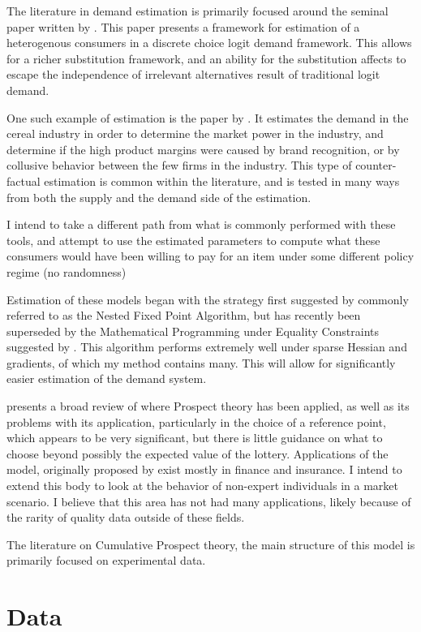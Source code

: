 \documentclass[12pt]{paper}
\begin{document}
The literature in demand estimation is primarily focused around the
seminal paper written by \cite*{BLP}. This paper presents a framework
for estimation of a heterogenous consumers in a discrete choice logit
demand framework. This allows for a richer substitution framework, and
an ability for the substitution affects to escape the independence of
irrelevant alternatives result of traditional logit demand.

One such example of estimation is the paper by \cite*{Cereal}. It
estimates the demand in the cereal industry in order to determine the
market power in the industry, and determine if the high product
margins were caused by brand recognition, or by collusive behavior
between the few firms in the industry. This type of counter-factual
estimation is common within the literature, and is tested in many ways
from both the supply and the demand side of the estimation.

I intend to take a different path from what is commonly performed with
these tools, and attempt to use the estimated parameters to compute
what these consumers would have been willing to pay for an item under
some different policy regime (no randomness)

Estimation of these models began with the strategy first suggested by
\cite{BLP} commonly referred to as the Nested Fixed Point Algorithm,
but has recently been superseded by the Mathematical Programming under
Equality Constraints suggested by \cite*{MPEC}. This algorithm
performs extremely well under sparse Hessian and gradients, of which
my method contains many. This will allow for significantly easier
estimation of the demand system.

\cite*{LitReview} presents a broad review of where Prospect theory has
been applied, as well as its problems with its application,
particularly in the choice of a reference point, which appears to be
very significant, but there is little guidance on what to choose
beyond possibly the expected value of the lottery. Applications of the
model, originally proposed by \cite*{Kahn} exist mostly in finance and
insurance. I intend to extend this body to look at the behavior of
non-expert individuals in a market scenario. I believe that this area
has not had many applications, likely because of the rarity of quality
data outside of these fields.

The literature on Cumulative Prospect theory, the main structure of
this model is primarily focused on experimental data. 


\section{Data}
\end{document}
